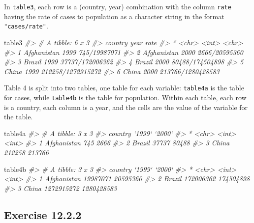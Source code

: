 \documentclass[]{book}
\newenvironment{Shaded}{\begin{snugshade}}{\end{snugshade}}
\newcommand{\CommentTok}[1]{\textcolor[rgb]{0.56,0.35,0.01}{\textit{#1}}}
\newcommand{\NormalTok}[1]{#1}
\theoremstyle{plain}
\theoremstyle{remark}
\begin{document}
In \texttt{table3}, each row is a (country, year) combination with the
column \texttt{rate} having the rate of cases to population as a
character string in the format \texttt{"cases/rate"}.

\begin{Shaded}
\begin{Highlighting}[]
\NormalTok{table3}
\CommentTok{#> # A tibble: 6 x 3}
\CommentTok{#>   country      year rate             }
\CommentTok{#> * <chr>       <int> <chr>            }
\CommentTok{#> 1 Afghanistan  1999 745/19987071     }
\CommentTok{#> 2 Afghanistan  2000 2666/20595360    }
\CommentTok{#> 3 Brazil       1999 37737/172006362  }
\CommentTok{#> 4 Brazil       2000 80488/174504898  }
\CommentTok{#> 5 China        1999 212258/1272915272}
\CommentTok{#> 6 China        2000 213766/1280428583}
\end{Highlighting}
\end{Shaded}

Table 4 is split into two tables, one table for each variable:
\texttt{table4a} is the table for cases, while \texttt{table4b} is the
table for population. Within each table, each row is a country, each
column is a year, and the cells are the value of the variable for the
table.

\begin{Shaded}
\begin{Highlighting}[]
\NormalTok{table4a}
\CommentTok{#> # A tibble: 3 x 3}
\CommentTok{#>   country     `1999` `2000`}
\CommentTok{#> * <chr>        <int>  <int>}
\CommentTok{#> 1 Afghanistan    745   2666}
\CommentTok{#> 2 Brazil       37737  80488}
\CommentTok{#> 3 China       212258 213766}
\end{Highlighting}
\end{Shaded}

\begin{Shaded}
\begin{Highlighting}[]
\NormalTok{table4b}
\CommentTok{#> # A tibble: 3 x 3}
\CommentTok{#>   country         `1999`     `2000`}
\CommentTok{#> * <chr>            <int>      <int>}
\CommentTok{#> 1 Afghanistan   19987071   20595360}
\CommentTok{#> 2 Brazil       172006362  174504898}
\CommentTok{#> 3 China       1272915272 1280428583}
\end{Highlighting}
\end{Shaded}

\hypertarget{exercise-12.2.2}{%
\subsection*{\texorpdfstring{Exercise
{12.2.2}}{Exercise 12.2.2}}\label{exercise-12.2.2}}
\end{document}
